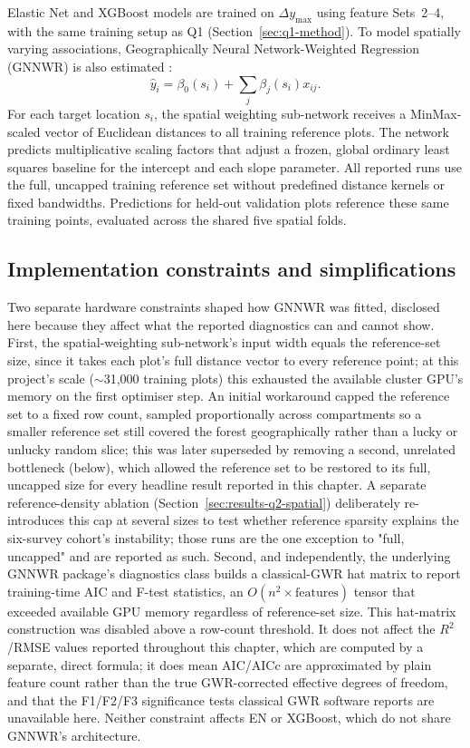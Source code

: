 Elastic Net and XGBoost models are trained on $\Delta y_{\max}$ using feature Sets~2--4, with the same training setup as Q1 (Section~\ref{sec:q1-method}). To model spatially varying associations, Geographically Neural Network-Weighted Regression (GNNWR) is also estimated \cite{du2020Geographically_C6_GWR}:
\begin{equation}
\hat y_i=\beta_0(s_i)+\sum_j\beta_j(s_i)x_{ij}.
\label{eq:gnnwr}
\end{equation}
For each target location $s_i$, the spatial weighting sub-network receives a MinMax-scaled vector of Euclidean distances to all training reference plots. The network predicts multiplicative scaling factors that adjust a frozen, global ordinary least squares baseline for the intercept and each slope parameter. All reported runs use the full, uncapped training reference set without predefined distance kernels or fixed bandwidths. Predictions for held-out validation plots reference these same training points, evaluated across the shared five spatial folds.

\subsection*{Implementation constraints and simplifications}
Two separate hardware constraints shaped how GNNWR was fitted, disclosed here because they affect what the reported diagnostics can and cannot show. First, the spatial-weighting sub-network's input width equals the reference-set size, since it takes each plot's full distance vector to every reference point; at this project's scale ($\sim$31,000 training plots) this exhausted the available cluster GPU's memory on the first optimiser step. An initial workaround capped the reference set to a fixed row count, sampled proportionally across compartments so a smaller reference set still covered the forest geographically rather than a lucky or unlucky random slice; this was later superseded by removing a second, unrelated bottleneck (below), which allowed the reference set to be restored to its full, uncapped size for every headline result reported in this chapter. A separate reference-density ablation (Section~\ref{sec:results-q2-spatial}) deliberately re-introduces this cap at several sizes to test whether reference sparsity explains the six-survey cohort's instability; those runs are the one exception to "full, uncapped" and are reported as such. Second, and independently, the underlying GNNWR package's diagnostics class builds a classical-GWR hat matrix to report training-time AIC and F-test statistics, an $O(n^2 \times \text{features})$ tensor that exceeded available GPU memory regardless of reference-set size. This hat-matrix construction was disabled above a row-count threshold. It does not affect the $R^2$/RMSE values reported throughout this chapter, which are computed by a separate, direct formula; it does mean AIC/AICc are approximated by plain feature count rather than the true GWR-corrected effective degrees of freedom, and that the F1/F2/F3 significance tests classical GWR software reports are unavailable here. Neither constraint affects EN or XGBoost, which do not share GNNWR's architecture.

